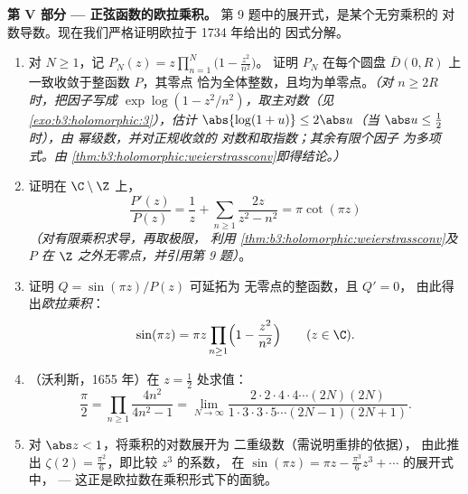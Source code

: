 \begin{problem}
\medskip
\noindent\textbf{第 V 部分 --- 正弦函数的欧拉乘积。}
第 9 题中的展开式，是某个无穷乘积的
对数导数。现在我们严格证明欧拉于 1734 年给出的
因式分解。
\begin{enumerate}[resume]
  \item 对 $N \geq 1$，记 $P_N(z) =
        z\prod_{n=1}^{N}\bigl(1 - \frac{z^2}{n^2}\bigr)$。
        证明 $P_N$ 在每个圆盘
        $\bar D(0, R)$ 上一致收敛于整函数 $P$，其零点
        恰为全体整数，且均为单零点。\emph{（对 $n
        \geq 2R$ 时，把因子写成 $\exp\log(1 -
        z^2/n^2)$，取主对数（见
        \cref{exo:b3:holomorphic:3}），估计 $\abs{\log(1+u)}
        \leq 2\abs u$（当 $\abs u \leq \frac12$ 时），由
        幂级数，并对正规收敛的
        对数和取指数；其余有限个因子
        为多项式。由
        \cref{thm:b3:holomorphic:weierstrassconv}即得结论。）}
  \item 证明在 $\C\setminus\Z$ 上，
        \[
        \frac{P'(z)}{P(z)} = \frac1z +
        \sum_{n\geq1}\frac{2z}{z^2 - n^2} = \pi\cot(\pi z)
        \]
        \emph{（对有限乘积求导，再取极限，
        利用
        \cref{thm:b3:holomorphic:weierstrassconv}及
        $P$ 在 $\Z$ 之外无零点，并引用第
        9 题）}。
  \item 证明 $Q = \sin(\pi z)/P(z)$ 可延拓为
        无零点的整函数，且 $Q' = 0$，
        由此得出\emph{欧拉乘积}：
        \[
        \sin(\pi z) = \pi z\prod_{n\geq1}
        \Bigl(1 - \frac{z^2}{n^2}\Bigr)
        \qquad (z \in \C) .
        \]
  \item （沃利斯，1655 年）在 $z = \frac12$ 处求值：
        \[
        \frac\pi2 = \prod_{n\geq1}\frac{4n^2}{4n^2 - 1}
        = \lim_{N\to\infty}
        \frac{2\cdot2\cdot4\cdot4\cdots(2N)(2N)}
        {1\cdot3\cdot3\cdot5\cdots(2N-1)(2N+1)} .
        \]
  \item 对 $\abs z < 1$，将乘积的对数展开为
        二重级数（需说明重排的依据），
        由此推出 $\zeta(2) =
        \frac{\pi^2}6$，即比较 $z^3$ 的系数，
        在 $\sin(\pi z) = \pi z - \frac{\pi^3}6z^3 + \cdots$ 的展开式中，
        --- 这正是欧拉数在乘积形式下的面貌。
\end{enumerate}


\end{problem}
